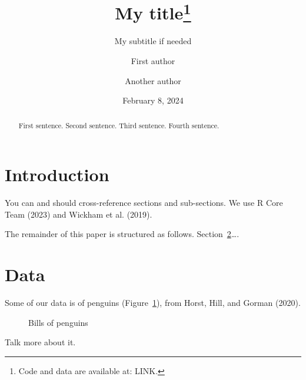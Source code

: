 \documentclass[
  letterpaper,
  DIV=11,
  numbers=noendperiod]{scrartcl}
\title{My title\thanks{Code and data are available at: LINK.}}
\subtitle{My subtitle if needed}
\author{First author \and Another author}
\date{February 8, 2024}
\begin{document}
\maketitle
\begin{abstract}
First sentence. Second sentence. Third sentence. Fourth sentence.
\end{abstract}

\section{Introduction}\label{introduction}

You can and should cross-reference sections and sub-sections. We use R
Core Team (2023) and Wickham et al. (2019).

The remainder of this paper is structured as follows.
Section~\ref{sec-data}\ldots.

\section{Data}\label{sec-data}

Some of our data is of penguins (Figure~\ref{fig-bills}), from Horst,
Hill, and Gorman (2020).

\begin{figure}


\caption{\label{fig-bills}Bills of penguins}

\end{figure}%

Talk more about it.
\end{document}
